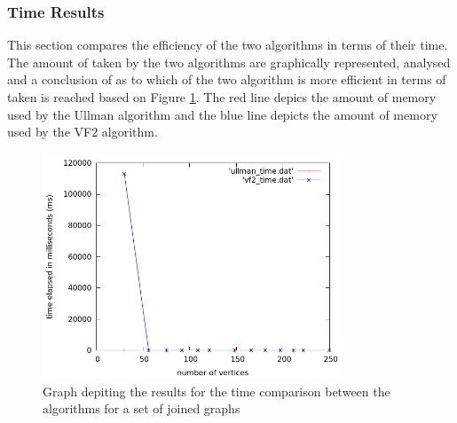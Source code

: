 \subsubsection{Time Results}
\label{Time Results}
This section compares the efficiency of the two algorithms in terms of their time. The amount of taken by the two algorithms are graphically 
represented, analysed and a conclusion of as to which of the two algorithm is more efficient in terms of taken is reached based on Figure \ref{fig:time_comparison}.
The red line depics the amount of memory used by the Ullman algorithm and the blue line depicts the amount of memory used by the VF2 algorithm.
\begin{figure}[H]
  \begin{center}
      \includegraphics[width=0.8\textwidth]{time_comparison.png}
  \end{center}    
  \caption{Graph depiting the results for the time comparison between the algorithms for a set of joined graphs}
  \label{fig:time_comparison}
\end{figure}

